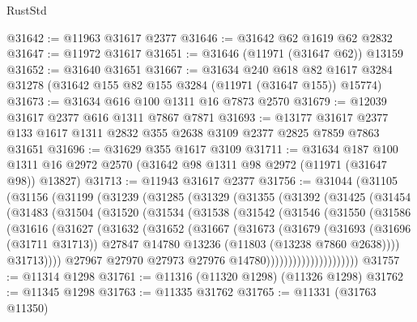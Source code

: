 \begin{lexlean}{RustStd}
\begin{coremodule}
@31642 := @11963 @31617 @2377
@31646 := @31642 @62 @1619 @62 @2832
@31647 := @11972 @31617
@31651 := @31646 (@11971 (@31647 @62)) @13159
@31652 := @31640 @31651
@31667 := @31634
    @240
    @618
    @82
    @1617
    @3284
    @31278
    (@31642 @155 @82 @155 @3284 (@11971 (@31647 @155)) @15774)
@31673 := @31634 @616 @100 @1311 @16 @7873 @2570
@31679 := @12039 @31617 @2377 @616 @1311 @7867 @7871
@31693 := @13177 @31617 @2377 @133 @1617 @1311 @2832 @355 @2638 @3109 @2377 @2825 @7859 @7863 @31651
@31696 := @31629 @355 @1617 @3109
@31711 := @31634
    @187
    @100
    @1311
    @16
    @2972
    @2570
    (@31642 @98 @1311 @98 @2972 (@11971 (@31647 @98)) @13827)
@31713 := @11943 @31617 @2377
@31756 := @31044
    (@31105
      (@31156
        (@31199
          (@31239
            (@31285
              (@31329
                (@31355
                  (@31392
                    (@31425
                      (@31454
                        (@31483
                          (@31504
                            (@31520
                              (@31534
                                (@31538
                                  (@31542
                                    (@31546
                                      (@31550
                                        (@31586
                                          (@31616
                                            (@31627
                                              (@31632
                                                (@31652
                                                  (@31667
                                                    (@31673
                                                      (@31679
                                                        (@31693
                                                          (@31696 (@31711 @31713))
                                                          @27847
                                                          @14780
                                                          @13236
                                                          (@11803 (@13238 @7860 @2638))))
                                                      @31713))))
                                              @27967
                                              @27970
                                              @27973
                                              @27976
                                              @14780)))))))))))))))))))))
@31757 := @11314 @1298
@31761 := @11316 (@11320 @1298) (@11326 @1298)
@31762 := @11345 @1298
@31763 := @11335 @31762
@31765 := @11331 (@31763 @11350)

\end{coremodule}
\end{lexlean}
